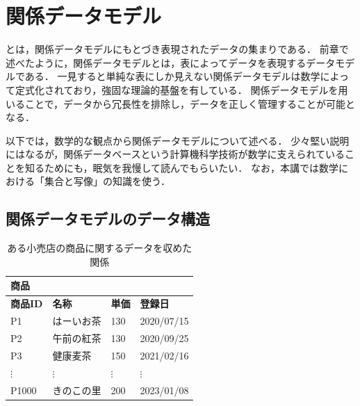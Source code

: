 \chapter{関係データモデル}

 とは，関係データモデルにもとづき表現されたデータの集まりである．
前章で述べたように，関係データモデルとは，表によってデータを表現するデータモデルである．
一見すると単純な表にしか見えない関係データモデルは数学によって定式化されており，強固な理論的基盤を有している．
関係データモデルを用いることで，データから冗長性を排除し，データを正しく管理することが可能となる．

以下では，数学的な観点から関係データモデルについて述べる．
少々堅い説明にはなるが，関係データベースという計算機科学技術が数学に支えられていることを知るためにも，眠気を我慢して読んでもらいたい．
なお，本講では数学における「集合と写像」の知識を使う．



\section{関係データモデルのデータ構造}
\begin{table}[tb]
\centering
\caption{ある小売店の商品に関するデータを収めた関係}
\label{tab:correct-table}
\begin{tabular}{@{}llll@{}}
商品            &             &             &              \\ \midrule
\textbf{商品ID} & \textbf{名称} & \textbf{単価} & \textbf{登録日} \\ \midrule
P1            & はーいお茶       & 130         & 2020/07/15   \\
P2            & 午前の紅茶       & 130         & 2020/09/25   \\
P3            & 健康麦茶        & 150         & 2021/02/16   \\
$\vdots$      & $\vdots$    & $\vdots$    & $\vdots$     \\
P1000         & きのこの里       & 200         & 2023/01/08   \\ \bottomrule
\end{tabular}
\end{table}

